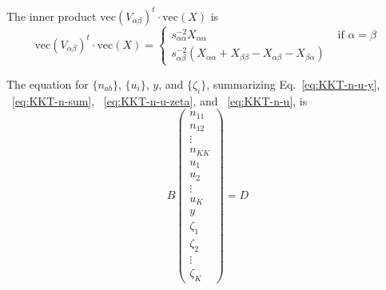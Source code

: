 \documentclass{article}
\newcommand*{\mvec}{\mathbf{\mathrm{vec}}}
\begin{document}
The inner product $\mvec( V_{\alpha\beta})^t \cdot \mvec( X )$ is
\begin{equation}
\mvec( V_{\alpha\beta})^t \cdot \mvec( X ) = \left\{
\begin{array}{cl}
s_{\alpha\alpha}^{-2} X_{\alpha\alpha}   & \text{ if } \alpha = \beta \\
s_{\alpha\beta}^{-2} \left(X_{\alpha\alpha} + X_{\beta\beta} - X_{\alpha\beta} - X_{\beta\alpha}\right)
\end{array} \right.
\end{equation}

The equation for $\{n_{ab}\}$, $\{u_i\}$, $y$, and $\{ \zeta_i \}$, summarizing Eq.~\ref{eq:KKT-n-u-y}, ~\ref{eq:KKT-n-sum}, ~\ref{eq:KKT-n-u-zeta}, and ~\ref{eq:KKT-n-u}, is
\begin{equation}
B \left(
\begin{array}{c}
n_{11} \\
n_{12} \\
\vdots \\
n_{KK} \\
u_1 \\
u_2 \\
\vdots \\
u_K \\
y \\
\zeta_1 \\
\zeta_2 \\
\vdots \\
\zeta_K
\end{array} \right) = D
\end{equation}
  
\end{document}
